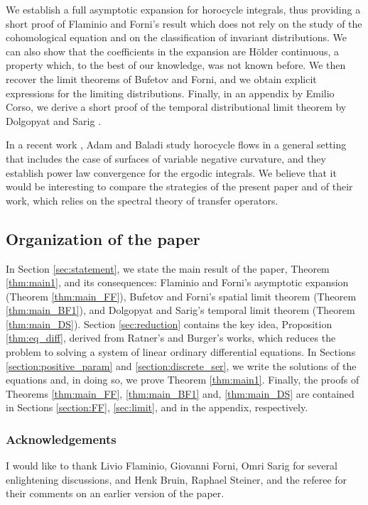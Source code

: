 \documentclass[11pt]{article}
\theoremstyle{definition}
\begin{document}
We establish a full asymptotic expansion for horocycle integrals, thus providing a short proof of Flaminio and Forni's result which does not rely on the study of the cohomological equation and on the classification of invariant distributions.
We can also show that the coefficients in the expansion are Hölder continuous, a property which, to the best of our knowledge, was not known before.
We then recover the limit theorems of Bufetov and Forni, and we obtain explicit expressions for the limiting distributions.
Finally, in an appendix by Emilio Corso, we derive a short proof of the temporal distributional limit theorem by Dolgopyat and Sarig \cite{Dolgopyat-Sarig}.

In a recent work \cite{AdBa}, Adam and Baladi study horocycle flows in a general setting that includes the case of surfaces of variable negative curvature, and they establish power law convergence for the ergodic integrals. We believe that it would be interesting to compare the strategies of the present paper and of their work, which relies on the spectral theory of transfer operators.

\subsection{Organization of the paper}

In Section \ref{sec:statement}, we state the main result of the paper, Theorem \ref{thm:main1}, and its consequences: Flaminio and Forni's asymptotic expansion (Theorem \ref{thm:main_FF}), Bufetov and Forni's spatial limit theorem (Theorem \ref{thm:main_BF1}), and Dolgopyat and Sarig's temporal limit theorem (Theorem \ref{thm:main_DS}).
Section \ref{sec:reduction} contains the key idea, Proposition \ref{thm:eq_diff}, derived from Ratner's and Burger's works, which reduces the problem to solving a system of linear ordinary differential equations. In Sections \ref{section:positive_param} and \ref{section:discrete_ser}, we write the solutions of the equations and, in doing so, we prove Theorem \ref{thm:main1}. Finally, the proofs of Theorems \ref{thm:main_FF}, \ref{thm:main_BF1} and, \ref{thm:main_DS} are contained in Sections \ref{section:FF}, \ref{sec:limit}, and in the appendix, respectively.

\subsubsection*{Acknowledgements}
I would like to thank Livio Flaminio, Giovanni Forni, Omri Sarig for several enlightening discussions, and Henk Bruin, Raphael Steiner, and the referee for their comments on an earlier version of the paper.
\end{document}
